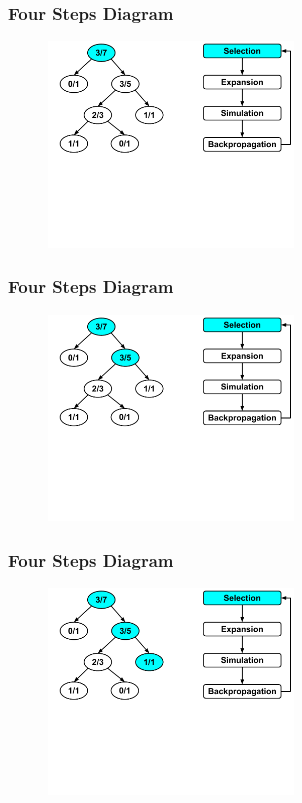 \documentclass{beamer}
\begin{document}

\begin{frame}[fragile]
\frametitle{Four Steps Diagram}
\begin{figure}[h]
	\includegraphics[width=6.5cm]{Diagrams/MCTSShort/MCTSShortTwoOneOne.pdf}
	\centering
\end{figure}
\end{frame}

\begin{frame}[fragile]
\frametitle{Four Steps Diagram}
\begin{figure}[h]
	\includegraphics[width=6.5cm]{Diagrams/MCTSShort/MCTSShortTwoOneTwo.pdf}
	\centering
\end{figure}
\end{frame}

\begin{frame}[fragile]
\frametitle{Four Steps Diagram}
\begin{figure}[h]
	\includegraphics[width=6.5cm]{Diagrams/MCTSShort/MCTSShortTwoOneThree.pdf}
	\centering
\end{figure}
\end{frame}
\end{document}
